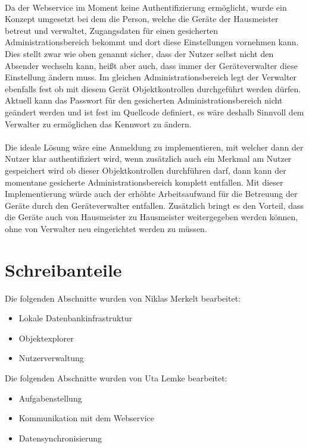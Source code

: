 \documentclass[12pt]{article}
\begin{document}
\paragraph{}Da der Webservice im Moment keine Authentifizierung ermöglicht, wurde ein Konzept umgesetzt bei dem die Person, welche die Geräte der Hausmeister betreut und verwaltet, Zugangsdaten für einen gesicherten Administrationsbereich bekommt und dort diese Einstellungen vornehmen kann. Dies stellt zwar wie oben genannt sicher, dass der Nutzer selbst nicht den Absender wechseln kann, heißt aber auch, dass immer der Geräteverwalter diese Einstellung ändern muss. Im gleichen Administrationsbereich legt der Verwalter ebenfalls fest ob mit diesem Gerät Objektkontrollen durchgeführt werden dürfen. Aktuell kann das Passwort für den gesicherten Administrationsbereich nicht geändert werden und ist fest im Quellcode definiert, es wäre deshalb Sinnvoll dem Verwalter zu ermöglichen das Kennwort zu ändern.

\paragraph{}Die ideale Lösung wäre eine Anmeldung zu implementieren, mit welcher dann der Nutzer klar authentifiziert wird, wenn zusätzlich auch ein Merkmal am Nutzer gespeichert wird ob dieser Objektkontrollen durchführen darf, dann kann der momentane gesicherte Administrationsbereich komplett entfallen. Mit dieser Implementierung würde auch der erhöhte Arbeitsaufwand für die Betreuung der Geräte durch den Geräteverwalter entfallen. Zusätzlich bringt es den Vorteil, dass die Geräte auch von Hausmeister zu Hausmeister weitergegeben werden können, ohne von Verwalter neu eingerichtet werden zu müssen.

\section{Schreibanteile}

Die folgenden Abschnitte wurden von Niklas Merkelt bearbeitet:
\begin{itemize}
	\item Lokale Datenbankinfrastruktur
	\item Objektexplorer
	\item Nutzerverwaltung
\end{itemize}
Die folgenden Abschnitte wurden von Uta Lemke bearbeitet:
\begin{itemize}
	\item Aufgabenstellung
	\item Kommunikation mit dem Webservice
	\item Datensynchronisierung
\end{itemize}
\end{document}

